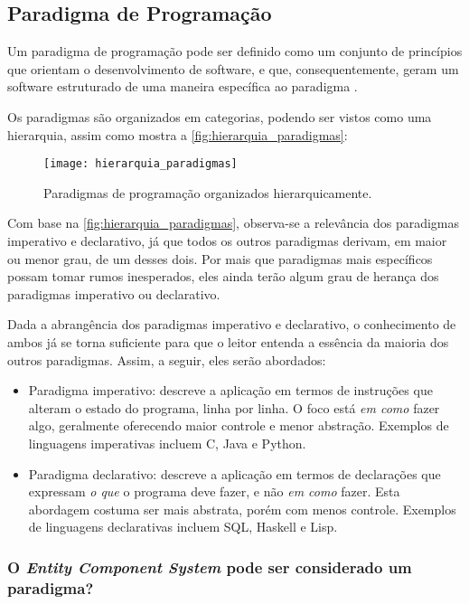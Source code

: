 \subsection{Paradigma de Programação}

Um paradigma de programação pode ser definido como um conjunto de princípios que orientam o desenvolvimento de software, e que, consequentemente, geram um software estruturado de uma maneira específica ao paradigma \cite{programmingparadigmsionos}.

Os paradigmas são organizados em categorias, podendo ser vistos como uma hierarquia, assim como mostra a \autoref{fig:hierarquia_paradigmas}:

\begin{figure}[H]
	\centering
	\texttt{[image: hierarquia\_paradigmas]}
	\caption{Paradigmas de programação organizados hierarquicamente.}
	\label{fig:hierarquia_paradigmas}
\end{figure}

Com base na \autoref{fig:hierarquia_paradigmas}, observa-se a relevância dos paradigmas imperativo e declarativo, já que todos os outros paradigmas derivam, em maior ou menor grau, de um desses dois. Por mais que paradigmas mais específicos possam tomar rumos inesperados, eles ainda terão algum grau de herança dos paradigmas imperativo ou declarativo.

Dada a abrangência dos paradigmas imperativo e declarativo, o conhecimento de ambos já se torna suficiente para que o leitor entenda a essência da maioria dos outros paradigmas. Assim, a seguir, eles serão abordados:

\begin{itemize}
    \item Paradigma imperativo: descreve a aplicação em termos de instruções que alteram o estado do programa, linha por linha. O foco está \textit{em como} fazer algo, geralmente oferecendo maior controle e menor abstração. Exemplos de linguagens imperativas incluem C, Java e Python.
    \item Paradigma declarativo: descreve a aplicação em termos de declarações que expressam \textit{o que} o programa deve fazer, e não \textit{em como} fazer. Esta abordagem costuma ser mais abstrata, porém com menos controle. Exemplos de linguagens declarativas incluem SQL, Haskell e Lisp.
\end{itemize}

\subsubsection{O \textit{Entity Component System} pode ser considerado um paradigma?}

